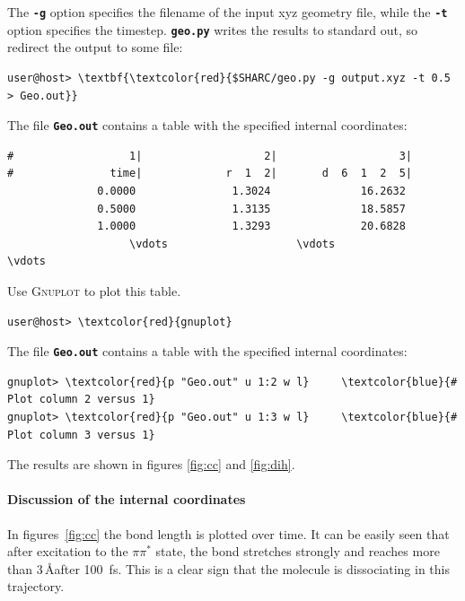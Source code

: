 \documentclass[a4paper,11pt,DIV=15,openany]{scrbook}
\newcommand{\ttt}[1]{\textbf{\texttt{#1}}}
\begin{document}
\normalsize
The \ttt{-g} option specifies the filename of the input xyz geometry file, while the \ttt{-t} option specifies the timestep. \ttt{geo.py} writes the results to standard out, so redirect the output to some file:
\begin{Verbatim}[commandchars=\\\{\}]
user@host> \textbf{\textcolor{red}{$SHARC/geo.py -g output.xyz -t 0.5 > Geo.out}}
\end{Verbatim}
The file \ttt{Geo.out} contains a table with the specified internal coordinates:
\begin{oframed}
\footnotesize\begin{Verbatim}[commandchars=\\\{\}]
#                  1|                   2|                   3|
#               time|             r  1  2|       d  6  1  2  5|
              0.0000               1.3024              16.2632 
              0.5000               1.3135              18.5857 
              1.0000               1.3293              20.6828 
                   \vdots                    \vdots                    \vdots
\end{Verbatim}
\end{oframed}

Use \textsc{Gnuplot} to plot this table. 
\begin{Verbatim}[commandchars=\\\{\}]
user@host> \textcolor{red}{gnuplot}
\end{Verbatim}
The file \ttt{Geo.out} contains a table with the specified internal coordinates:
\begin{oframed}
\footnotesize\begin{Verbatim}[commandchars=\\\{\}]
gnuplot> \textcolor{red}{p "Geo.out" u 1:2 w l}     \textcolor{blue}{# Plot column 2 versus 1}
gnuplot> \textcolor{red}{p "Geo.out" u 1:3 w l}     \textcolor{blue}{# Plot column 3 versus 1}
\end{Verbatim}
\end{oframed}

\normalsize
The results are shown in figures \ref{fig:cc} and \ref{fig:dih}.

\paragraph{Discussion of the internal coordinates} 

In figures~\ref{fig:cc} the  bond length is plotted over time. It can be easily seen that after excitation to the $\pi\pi^*$ state, the  bond stretches strongly and reaches more than 3\,\AA after 100~fs.
This is a clear sign that the  molecule is dissociating in this trajectory.
\end{document}
